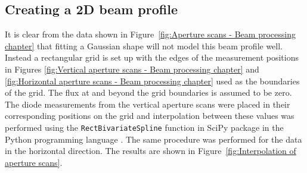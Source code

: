 \subsection{Creating a 2D beam profile}
\label{sub:Creating a 2D beam profile}
It is clear from the data shown in Figure~\ref{fig:Aperture scans - Beam processing chapter} that fitting a Gaussian shape will not model this beam profile well.
Instead a rectangular grid is set up with the edges of the measurement positions in Figures \ref{fig:Vertical aperture scans - Beam processing chapter} and \ref{fig:Horizontal aperture scans - Beam processing chapter} used as the boundaries of the grid.
The flux at and beyond the grid boundaries is assumed to be zero.
The diode measurements from the vertical aperture scans were placed in their corresponding positions on the grid and interpolation between these values was performed using the \verb+RectBivariateSpline+ function in SciPy package in the Python programming language \cite{jones2014scipy}.
The same procedure was performed for the data in the horizontal direction.
The results are shown in Figure~\ref{fig:Interpolation of aperture scans}.
